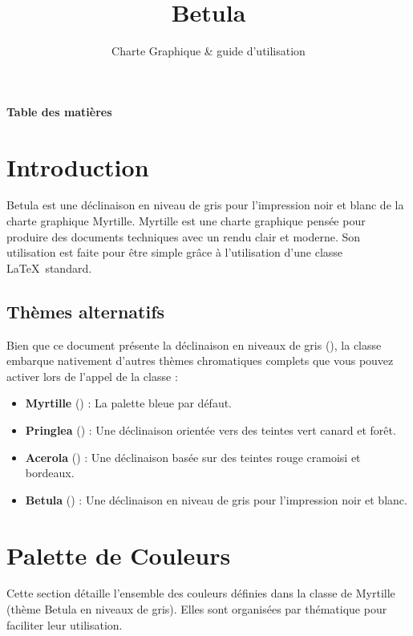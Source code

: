\documentclass[theme=betula]{myrtille}
\title{Betula}
\subtitle{Charte Graphique \& guide d'utilisation}
\begin{document}
\makecover

{\sffamily\Large\bfseries\color{dark} Table des matières}\par
\vspace{-15pt} %
\hrulefull
\tableofcontents

\newpage


\section{Introduction}
Betula est une déclinaison en niveau de gris pour l'impression noir et blanc de la charte graphique Myrtille. Myrtille est une charte graphique pensée pour produire des documents techniques avec un rendu clair et moderne. Son utilisation est faite pour être simple grâce à l'utilisation d'une classe \LaTeX\ standard. 

\subsection{Thèmes alternatifs}
Bien que ce document présente la déclinaison en niveaux de gris (), la classe embarque nativement d'autres thèmes chromatiques complets que vous pouvez activer lors de l'appel de la classe :
\begin{itemize}
    \item \textbf{Myrtille} () : La palette bleue par défaut.
    \item \textbf{Pringlea} () : Une déclinaison orientée vers des teintes vert canard et forêt.
    \item \textbf{Acerola} () : Une déclinaison basée sur des teintes rouge cramoisi et bordeaux.
    \item \textbf{Betula} () : Une déclinaison en niveau de gris pour l'impression noir et blanc.
\end{itemize}

\section{Palette de Couleurs}
Cette section détaille l'ensemble des couleurs définies dans la classe de Myrtille (thème Betula en niveaux de gris). Elles sont organisées par thématique pour faciliter leur utilisation.
\end{document}
